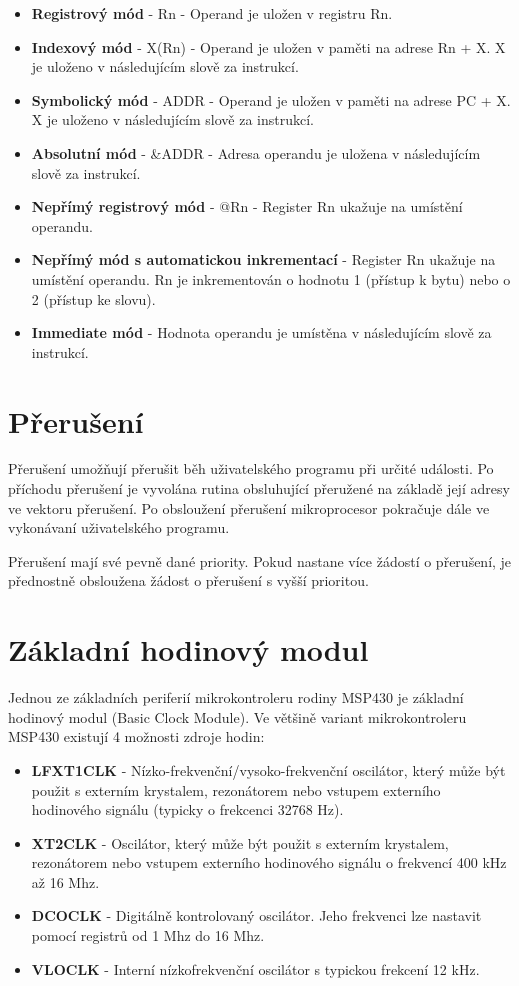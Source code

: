 \begin{itemize}
\item \textbf{Registrový mód} - Rn - Operand je uložen v registru Rn.
\item \textbf{Indexový mód} - X(Rn) - Operand je uložen v paměti na adrese Rn + X. X je uloženo v následujícím slově za instrukcí.
\item \textbf{Symbolický mód} - ADDR - Operand je uložen v paměti na adrese PC + X. X je uloženo v následujícím slově za instrukcí.
\item \textbf{Absolutní mód} - \&ADDR - Adresa operandu je uložena v následujícím slově za instrukcí.
\item \textbf{Nepřímý registrový mód} - @Rn - Register Rn ukažuje na umístění operandu.
\item \textbf{Nepřímý mód s automatickou inkrementací} - Register Rn ukažuje na umístění operandu. Rn je inkrementován o hodnotu 1 (přístup k bytu) nebo o 2 (přístup ke slovu).
\item \textbf{Immediate mód} - Hodnota operandu je umístěna v následujícím slově za instrukcí.
\end{itemize}


\section{Přerušení}

Přerušení umožňují přerušit běh uživatelského programu při určité události. Po příchodu přerušení je vyvolána rutina obsluhující přeružené na základě její adresy ve vektoru přerušení. Po obsloužení přerušení mikroprocesor pokračuje dále ve vykonávaní uživatelského programu.

Přerušení mají své pevně dané priority. Pokud nastane více žádostí o přerušení, je přednostně obsloužena žádost o přerušení s vyšší prioritou.

\section{Základní hodinový modul}

Jednou ze základních periferií mikrokontroleru rodiny MSP430 je základní hodinový modul (Basic Clock Module). Ve většině variant mikrokontroleru MSP430
existují 4 možnosti zdroje hodin:

\begin{itemize}
\item \textbf{LFXT1CLK} - Nízko-frekvenční/vysoko-frekvenční oscilátor, který může být použit s externím krystalem, rezonátorem nebo vstupem externího hodinového signálu (typicky o frekcenci 32768 Hz).
\item \textbf{XT2CLK} - Oscilátor, který může být použit s externím krystalem, rezonátorem nebo vstupem externího hodinového signálu o frekvencí 400 kHz až 16 Mhz.
\item \textbf{DCOCLK} - Digitálně kontrolovaný oscilátor. Jeho frekvenci lze nastavit pomocí registrů od 1 Mhz do 16 Mhz.
\item \textbf{VLOCLK} - Interní nízkofrekvenční oscilátor s typickou frekcení 12 kHz.
\end{itemize}

